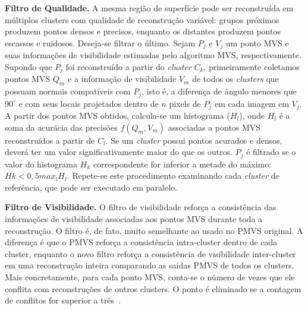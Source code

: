 \noindent\textbf{Filtro de Qualidade.}
A mesma região de superfície pode ser reconstruída em múltiplos clusters com
qualidade de reconstrução variável: grupos próximos produzem pontos densos e
precisos, enquanto os distantes produzem pontos escassos e ruidosos.
Deseja-se filtrar o último.  Sejam $P_j$ e $V_j$ um ponto MVS
e suas informações de visibilidade estimadas pelo algoritmo MVS,
respectivamente. Supondo que $P_j$ foi reconstruído a partir do \emph{cluster}
$C_k$, primeiramente coletamos pontos MVS ${Q_m}$ e a informação de
visibilidade ${V_m}$ de todos os \emph{clusters} que possuam normais compatíveis
com $P_j$, isto é, a diferença de ângulo menores que $90^\circ$ e com seus locais
projetados dentro de $n$ pixels de $P_j$ em cada imagem em $V_j$. A partir dos
pontos MVS obtidos, calcula-se um histograma ($H_l$), onde $H_l$ é a soma da
acurácia das precisões $f(Q_m,V_m)$ associadas a pontos MVS reconstruídos a
partir de $C_l$. Se um \emph{cluster} possui pontos acurados e densos,
deverá ter um valor significativamente maior do que os outros. $P_j$ é
filtrado se o valor do histograma $H_k$ correspondente for inferior a metade do
máximo: $Hk < 0,5 max_l H_l$. Repete-se este procedimento examinando cada
\emph{cluster} de referência, que pode ser executado em paralelo. 

\noindent\textbf{Filtro de Visibilidade.}
O filtro de visibilidade reforça a consistência das informações de visibilidade
associadas aos pontos MVS durante toda a reconstrução. O filtro é, de fato,
muito semelhante ao usado no PMVS original. A diferença é que o PMVS reforça a
consistência intra-cluster dentro de cada cluster, enquanto o novo filtro reforça
a consistência de visibilidade inter-cluster em uma reconstrução inteira
comparando as saídas PMVS de todos os clusters. Mais concretamente, para cada
ponto MVS, conta-se o número de vezes que ele conflita com reconstruções de
outros clusters. O ponto é eliminado se a contagem de
conflitos for superior a três~\cite{furukawa2010towards,furukawa2010accurate}.


